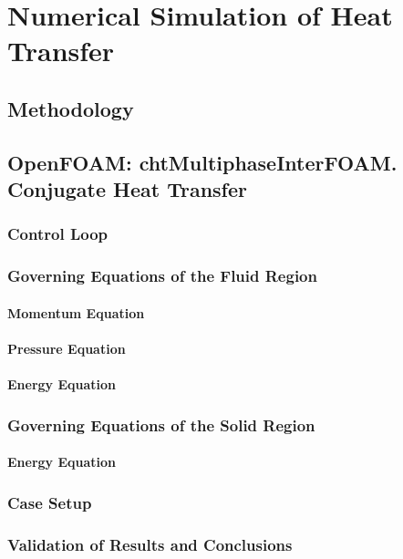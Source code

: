\chapter{Numerical Simulation of Heat Transfer} %

\label{Chapter4}

\section{Methodology}
\section{OpenFOAM: chtMultiphaseInterFOAM. Conjugate Heat Transfer}
\subsection{Control Loop}
\subsection{Governing Equations of the Fluid Region}
\subsubsection{Momentum Equation}
\subsubsection{Pressure Equation}
\subsubsection{Energy Equation}
\subsection{Governing Equations of the Solid Region}
\subsubsection{Energy Equation}
\subsection{Case Setup}
\subsection{Validation of Results and Conclusions}

